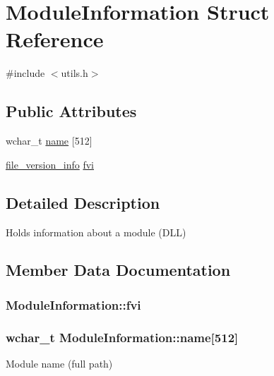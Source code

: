 \section{Module\-Information Struct Reference}
\label{struct_module_information}


{\ttfamily \#include $<$utils.\-h$>$}

\subsection*{Public Attributes}
\begin{DoxyCompactItemize}
\item 
wchar\-\_\-t \hyperlink{struct_module_information_a602561022c3549bcce238ac536d5c2ed}{name} \mbox{[}512\mbox{]}
\item 
\hyperlink{structfile__version__info}{file\-\_\-version\-\_\-info} \hyperlink{struct_module_information_a25986b2a82a82066b8864d4c3d8bbf6e}{fvi}
\end{DoxyCompactItemize}


\subsection{Detailed Description}
Holds information about a module (D\-L\-L) 

\subsection{Member Data Documentation}
\subsubsection[{fvi}]{ Module\-Information\-::fvi}\label{struct_module_information_a25986b2a82a82066b8864d4c3d8bbf6e}
\subsubsection[{name}]{\setlength{\rightskip}{0pt plus 5cm}wchar\-\_\-t Module\-Information\-::name\mbox{[}512\mbox{]}}\label{struct_module_information_a602561022c3549bcce238ac536d5c2ed}
Module name (full path) 